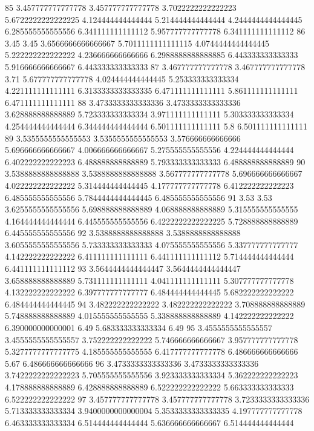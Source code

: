 85 3.457777777777778 3.457777777777778 3.7022222222222223 5.6722222222222225 4.124444444444444 5.214444444444444 4.2444444444444445 6.285555555555556 6.341111111111112 5.957777777777778 6.341111111111112
86 3.45 3.45 3.6566666666666667 5.7011111111111115 4.0744444444444445 5.222222222222222 4.236666666666666 6.2988888888888885 6.443333333333333 5.916666666666667 6.443333333333333
87 3.467777777777778 3.467777777777778 3.71 5.677777777777778 4.024444444444445 5.253333333333334 4.221111111111111 6.3133333333333335 6.471111111111111 5.861111111111111 6.471111111111111
88 3.4733333333333336 3.4733333333333336 3.628888888888889 5.723333333333334 3.971111111111111 5.303333333333334 4.254444444444444 6.344444444444444 6.501111111111111 5.8 6.501111111111111
89 3.5355555555555553 3.5355555555555553 3.576666666666666 5.696666666666667 4.006666666666667 5.275555555555556 4.224444444444444 6.402222222222223 6.488888888888889 5.793333333333333 6.488888888888889
90 3.5388888888888888 3.5388888888888888 3.567777777777778 5.696666666666667 4.022222222222222 5.314444444444445 4.177777777777778 6.412222222222223 6.485555555555556 5.7844444444444445 6.485555555555556
91 3.53 3.53 3.6255555555555556 5.698888888888889 4.068888888888889 5.315555555555555 4.164444444444444 6.445555555555556 6.4222222222222225 5.728888888888889 6.445555555555556
92 3.5388888888888888 3.5388888888888888 3.6055555555555556 5.733333333333333 4.075555555555556 5.337777777777777 4.142222222222222 6.411111111111111 6.441111111111112 5.714444444444444 6.441111111111112
93 3.5644444444444447 3.5644444444444447 3.658888888888889 5.731111111111111 4.041111111111111 5.307777777777778 4.132222222222222 6.397777777777777 6.484444444444445 5.682222222222222 6.484444444444445
94 3.482222222222222 3.482222222222222 3.708888888888889 5.748888888888889 4.015555555555555 5.338888888888889 4.142222222222222 6.390000000000001 6.49 5.683333333333334 6.49
95 3.4555555555555557 3.4555555555555557 3.752222222222222 5.746666666666667 3.957777777777778 5.3277777777777775 4.185555555555555 6.417777777777778 6.486666666666666 5.67 6.486666666666666
96 3.4733333333333336 3.4733333333333336 3.7422222222222223 5.705555555555556 3.923333333333334 5.362222222222223 4.178888888888889 6.428888888888889 6.522222222222222 5.663333333333333 6.522222222222222
97 3.457777777777778 3.457777777777778 3.7233333333333336 5.713333333333334 3.9400000000000004 5.3533333333333335 4.197777777777778 6.463333333333334 6.514444444444444 5.636666666666667 6.514444444444444

